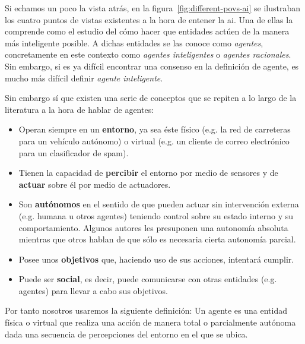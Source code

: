 Si echamos un poco la vista atrás, en la figura~\ref{fig:different-povs-ai} se ilustraban los cuatro puntos de vistas existentes a la hora de entener la \ac{ai}. Una de ellas la comprende como el estudio del cómo hacer que entidades actúen de la manera más inteligente posible. A dichas entidades se las conoce como \textit{agentes}, concretamente en este contexto como \textit{agentes inteligentes} o \textit{agentes racionales}. Sin embargo, si es ya difícil encontrar una consenso en la definición de agente, es mucho más difícil definir \textit{agente inteligente}.

Sin embargo sí que existen una serie de conceptos que se repiten a lo largo de la literatura a la hora de hablar de agentes:

\begin{itemize}
	\item Operan siempre en un \textbf{entorno}, ya sea éste físico (e.g. la red de carreteras para un vehículo autónomo) o virtual (e.g. un cliente de correo electrónico para un clasificador de spam).
	\item Tienen la capacidad de \textbf{percibir} el entorno por medio de sensores y de \textbf{actuar} sobre él por medio de actuadores.
	\item Son \textbf{autónomos} en el sentido de que pueden actuar sin intervención externa (e.g. humana u otros agentes) teniendo control sobre su estado interno y su comportamiento. Algunos autores les presuponen una autonomía absoluta mientras que otros hablan de que sólo es necesaria cierta autonomía parcial.
	\item Posee unos \textbf{objetivos} que, haciendo uso de sus acciones, intentará cumplir.
	\item Puede ser \textbf{social}, es decir, puede comunicarse con otras entidades (e.g. agentes) para llevar a cabo sus objetivos.
\end{itemize}

Por tanto nosotros usaremos la siguiente definición: Un agente es una entidad física o virtual que realiza una acción de manera total o parcialmente autónoma dada una secuencia de percepciones del entorno en el que se ubica.

